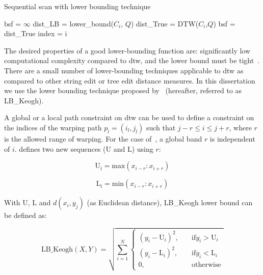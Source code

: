 \begin{algorithm}
	\caption{Sequential scan with lower bounding technique}
	\label{alg:sequential_scan_lower_bound}
	\begin{algorithmic}
		\State bsf = $\infty$	
			\State dist\_LB = lower\_bound($C_i$, $Q$)
				\State dist\_True = DTW($C_i$,$Q$)	
					\State bsf = dist\_True
					\State index = i 
				\EndIf
			\EndIf
		
		\EndFor
		
	\end{algorithmic}
\end{algorithm}

The desired properties of a good lower-bounding function are: significantly low computational complexity compared to \gls{dtw}, and the lower bound must be tight~\citep{Keogh2004}. There are a small number of lower-bounding techniques applicable to \gls{dtw} as compared to other string edit or tree edit distance measures. In this dissertation we use the lower bounding technique proposed by~\cite{Keogh2004} (hereafter, referred to as LB\_Keogh). 

A global or a local path constraint on \gls{dtw} can be used to define a constraint on the indices of the warping path $p_l = (i_l, j_l)$ such that $j-r \leq i \leq j+r$, where $r$ is the allowed range of warping. For the case of~\citep{Sakoe78TASLP}, a global band $r$ is independent of $i$. \cite{Keogh2004} defines two new sequences ($\mathrm{U}$ and $\mathrm{L}$) using $r$:

\begin{equation}
	\mathrm{U_i} = \mathrm{max}(x_{i-r}:x_{i+r})
\end{equation}

\begin{equation}
\mathrm{\mathrm{L}_i} = \mathrm{min}(x_{i-r}:x_{i+r})
\end{equation}

With $\mathrm{U}$, $\mathrm{L}$ and $d(x_i, y_j)$ (as Euclidean distance), LB\_Keogh lower bound can be defined as:

\begin{equation}
	\mathrm{LB\_Keogh}(X,Y) = \sqrt{\sum_{i=1}^{N}{\begin{cases}
			(y_i - \mathrm{U}_i)^2, & \quad \text{if} y_i > \mathrm{U}_i\\
			(y_i - \mathrm{L}_i)^2, & \quad \text{if} y_i < \mathrm{L}_i\\			
			0, & \quad \mathrm{otherwise}			
			\end{cases}}}
\end{equation}

